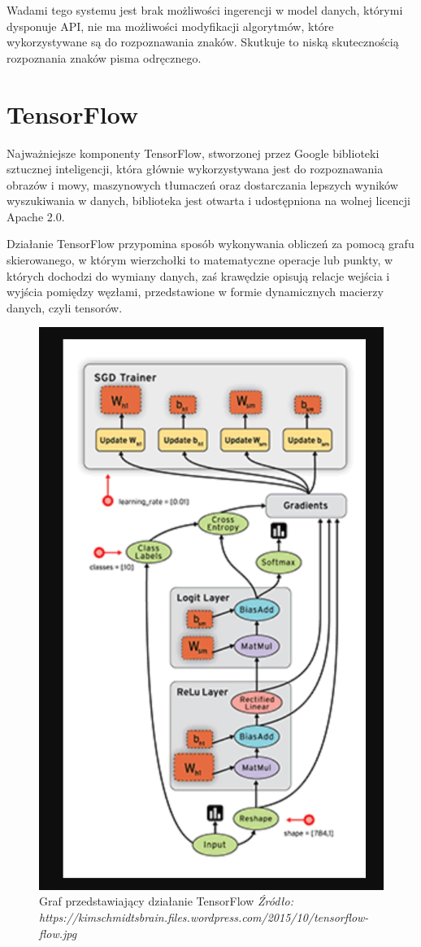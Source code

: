 \documentclass[brudnopis]{xmgr}
\begin{document}
Wadami tego systemu jest brak możliwości ingerencji w model danych, którymi dysponuje API, nie ma możliwości modyfikacji algorytmów, które wykorzystywane są do rozpoznawania znaków. Skutkuje to niską skutecznością rozpoznania znaków pisma odręcznego.

\section{TensorFlow}

Najważniejsze komponenty TensorFlow\cite{16}, stworzonej przez Google biblioteki sztucznej inteligencji, która głównie wykorzystywana jest do rozpoznawania obrazów i mowy, maszynowych tłumaczeń oraz dostarczania lepszych wyników wyszukiwania w danych, biblioteka jest otwarta i udostępniona na wolnej licencji Apache 2.0.

Działanie TensorFlow przypomina sposób wykonywania obliczeń za pomocą grafu skierowanego, w którym wierzchołki to matematyczne operacje lub punkty, w których dochodzi do wymiany danych, zaś krawędzie opisują relacje wejścia i wyjścia pomiędzy węzłami, przedstawione w formie dynamicznych macierzy danych, czyli tensorów.

\begin{figure}[!tbh]
\centering
\includegraphics[width=.8\hsize]{fig/tf}
\caption{Graf przedstawiający działanie TensorFlow \emph{Źródło: https://kimschmidtsbrain.files.wordpress.com/2015/10/tensorflow-flow.jpg}}
\end{figure}
\newpage
\end{document}

